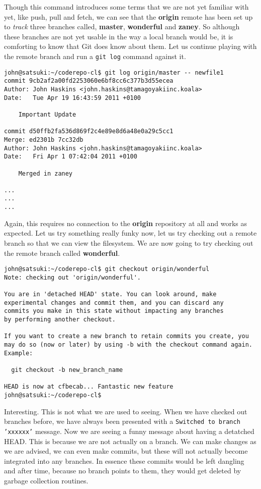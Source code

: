 Though this command introduces some terms that we are not yet familiar with yet, like push, pull and fetch, we can see that the \textbf{origin} remote has been set up to \emph{track} three branches called, \textbf{master}, \textbf{wonderful} and \textbf{zaney}.  So although these branches are not yet usable in the way a local branch would be, it is comforting to know that Git does know about them.  Let us continue playing with the remote branch and run a \texttt{git log} command against it.

\begin{Verbatim}
john@satsuki:~/coderepo-cl$ git log origin/master -- newfile1
commit 9cb2af2a00fd2253060e6bf8cc6c377b3d55ecea
Author: John Haskins <john.haskins@tamagoyakiinc.koala>
Date:   Tue Apr 19 16:43:59 2011 +0100

    Important Update

commit d50ffb2fa536d869f2c4e89e8d6a48e0a29c5cc1
Merge: ed2301b 7cc32db
Author: John Haskins <john.haskins@tamagoyakiinc.koala>
Date:   Fri Apr 1 07:42:04 2011 +0100

    Merged in zaney

...
...
...
\end{Verbatim}

Again, this requires no connection to the \textbf{origin} repository at all and works as expected.  Let us try something really funky now, let us try checking out a remote branch so that we can view the filesystem.  We are now going to try checking out the remote branch called \textbf{wonderful}.

\begin{Verbatim}
john@satsuki:~/coderepo-cl$ git checkout origin/wonderful
Note: checking out 'origin/wonderful'.

You are in 'detached HEAD' state. You can look around, make 
experimental changes and commit them, and you can discard any 
commits you make in this state without impacting any branches 
by performing another checkout.

If you want to create a new branch to retain commits you create, you 
may do so (now or later) by using -b with the checkout command again. 
Example:

  git checkout -b new_branch_name

HEAD is now at cfbecab... Fantastic new feature
john@satsuki:~/coderepo-cl$ 
\end{Verbatim}

Interesting.  This is not what we are used to seeing.  When we have checked out branches before, we have always been presented with a \texttt{Switched to branch 'xxxxxx'} message.  Now we are seeing a funny message about having a detatched HEAD.  This is because we are not actually on a branch.  We can make changes as we are advised, we can even make commits, but these will not actually become integrated into any branches.  In essence these commits would be left dangling and after time, because no branch points to them, they would get deleted by garbage collection routines.

